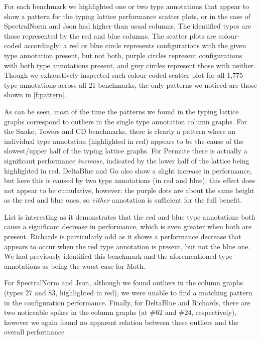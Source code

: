 \documentclass[sigplan,10pt,review,screen]{acmart}\settopmatter{printfolios=true}
\begin{document}
For each benchmark we highlighted one or two type annotations that appear to show a pattern for the typing lattice performance scatter plots, or in the case of SpectralNorm and Json had higher than usual columns. The identified types are those represented by the red and blue columns. The scatter plots are colour-coded accordingly: a red or blue circle represents configurations with the given type annotation present, but not both, purple circles represent configurations with both type annotations present, and grey circles represent those with neither. Though we exhaustively inspected such colour-coded scatter plot for all 1,775 type annotations across all 21 benchmarks, the only patterns we noticed are those shown in \ref{f:pattern}.

As can be seen, most of the time the patterns we found in the typing lattice graphs correspond to outliers in the single type annotation column graphs. For the Snake, Towers and CD benchmarks, there is clearly a pattern where an individual type annotation (highlighted in red) appears to be the cause of the slowest/upper half of the typing lattice graphs. For Permute there is actually a significant performance \emph{increase}, indicated by the lower half of the lattice being highlighted in red. DeltaBlue and Go also show a slight increase in performance, but here this is caused by two type annotations (in red and blue); this effect does not appear to be cumulative, however: the purple dots are about the same height as the red and blue ones, so \emph{either} annotation is sufficient for the full benefit.

List is interesting as it demonstrates that the red and blue type annotations both cause a significant decrease in performance, which is even greater when both are present. Richards is particularly odd as it shows a performance decrease that appears to occur when the red type annotation is present, but not the blue one. We had previously identified this benchmark and the aforementioned type annotations \cite{roberts-and-co-ecoop-2019} as being the worst case for Moth.

For SpectralNorm and Json, although we found outliers in the column graphs (types 27 and 83, highlighted in red), we were unable to find a matching pattern in the configuration performance.
Finally, for DeltaBlue and Richards, there are two noticeable spikes in the column graphs (at \#62 and \#24, respectively), however we again found no apparent relation between these outliers and the overall performance
\end{document}
